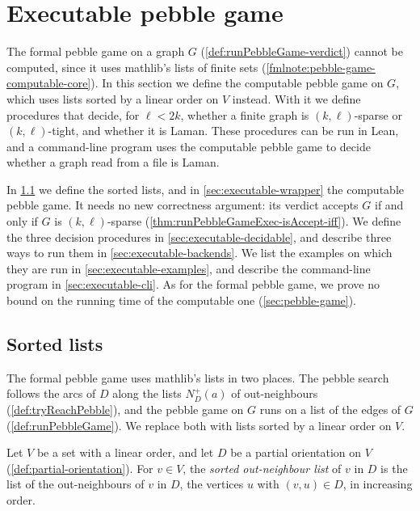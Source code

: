\section{Executable pebble game}
\label{sec:executable}

The formal pebble game on a graph $G$ (\cref{def:runPebbleGame-verdict})
cannot be computed, since it uses mathlib's lists of finite sets
(\cref{fmlnote:pebble-game-computable-core}). In this section we define
the computable pebble game on $G$, which uses lists sorted by a linear
order on $V$ instead. With it we define procedures that decide, for
$\ell < 2k$, whether a finite graph is $(k, \ell)$-sparse or
$(k, \ell)$-tight, and whether it is Laman. These procedures can be run
in Lean, and a command-line program uses the computable pebble game to
decide whether a graph read from a file is Laman.

In \cref{sec:executable-list-views} we define the sorted lists, and in
\cref{sec:executable-wrapper} the computable pebble game. It needs no
new correctness argument: its verdict accepts $G$ if and only if $G$ is
$(k, \ell)$-sparse (\cref{thm:runPebbleGameExec-isAccept-iff}). We define
the three decision procedures in \cref{sec:executable-decidable}, and
describe three ways to run them in \cref{sec:executable-backends}. We
list the examples on which they are run in
\cref{sec:executable-examples}, and describe the command-line program in
\cref{sec:executable-cli}. As for the formal pebble game, we prove no
bound on the running time of the computable one (\cref{sec:pebble-game}).

\subsection{Sorted lists}
\label{sec:executable-list-views}

The formal pebble game uses mathlib's lists in two places. The pebble
search follows the arcs of $D$ along the lists $N^+_D(a)$ of
out-neighbours (\cref{def:tryReachPebble}), and the pebble game on $G$
runs on a list of the edges of $G$ (\cref{def:runPebbleGame}). We
replace both with lists sorted by a linear order on $V$.

\begin{definition}
  \label{def:outListSorted}
  \leanok
  Let $V$ be a set with a linear order, and let $D$ be a partial
  orientation on $V$ (\cref{def:partial-orientation}). For $v \in V$,
  the \emph{sorted out-neighbour list} of $v$ in $D$ is the list of the
  out-neighbours of $v$ in $D$, the vertices $u$ with $(v, u) \in D$, in
  increasing order.
\end{definition}

